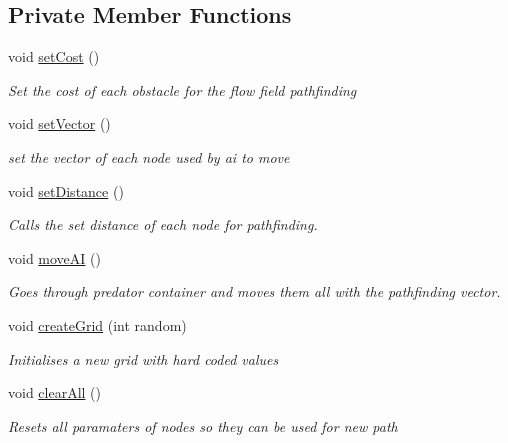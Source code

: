 \subsection*{Private Member Functions}
\begin{DoxyCompactItemize}
\item 
void \mbox{\hyperlink{class_grid_ab241558dff6456fdfc66c03a09d33479}{set\+Cost}} ()
\begin{DoxyCompactList}\small\item\em Set the cost of each obstacle for the flow field pathfinding \end{DoxyCompactList}\item 
void \mbox{\hyperlink{class_grid_ad4dcab53aae83978a77ad6b9cd459c3e}{set\+Vector}} ()
\begin{DoxyCompactList}\small\item\em set the vector of each node used by ai to move \end{DoxyCompactList}\item 
void \mbox{\hyperlink{class_grid_a357745b9903ca9c2a9c70024ad079ed1}{set\+Distance}} ()
\begin{DoxyCompactList}\small\item\em Calls the set distance of each node for pathfinding. \end{DoxyCompactList}\item 
void \mbox{\hyperlink{class_grid_aa662cb1071e1138c1c4cf1ddd592146b}{move\+AI}} ()
\begin{DoxyCompactList}\small\item\em Goes through predator container and moves them all with the pathfinding vector. \end{DoxyCompactList}\item 
void \mbox{\hyperlink{class_grid_af63dd2374a80c307414dae303b0d052e}{create\+Grid}} (int random)
\begin{DoxyCompactList}\small\item\em Initialises a new grid with hard coded values \end{DoxyCompactList}\item 
void \mbox{\hyperlink{class_grid_ad87359494dcfba12f838b621869794ae}{clear\+All}} ()
\begin{DoxyCompactList}\small\item\em Resets all paramaters of nodes so they can be used for new path \end{DoxyCompactList}\end{DoxyCompactItemize}
